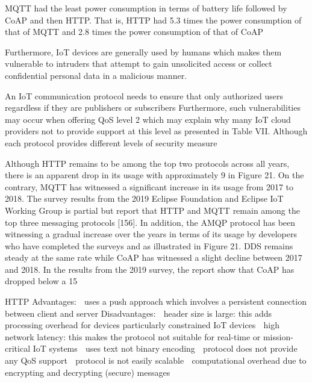  MQTT had the least power consumption in
terms of battery life followed by CoAP and then HTTP. That
is, HTTP had 5.3 times the power consumption of that of MQTT and 2.8 times the power consumption of that of CoAP \cite[23]{protocols}

Furthermore,
IoT devices are generally used by humans which makes them
vulnerable to intruders that attempt to gain unsolicited access
or collect confidential personal data in a malicious manner.
\cite[23]{protocols}

An IoT
communication protocol needs to ensure that only authorized
users regardless if they are publishers or subscribers
Furthermore, such vulnerabilities may occur when
offering QoS level 2 which may explain why many IoT cloud
providers not to provide support at this level as presented in
Table VII. 
Although each protocol provides different levels of
security measure\cite[23]{protocols}

Although HTTP remains to be among the top two
protocols across all years, there is an apparent drop in its
usage with approximately 9%
in Figure 21. On the contrary, MQTT has witnessed a
significant increase in its usage from 2017 to 2018. The
survey results from the 2019 Eclipse Foundation and Eclipse
IoT Working Group is partial but report that HTTP and
MQTT remain among the top three messaging protocols
[156]. In addition, the AMQP protocol has been witnessing
a gradual increase over the years in terms of its usage by
developers who have completed the surveys and as illustrated
in Figure 21. DDS remains steady at the same rate while
CoAP has witnessed a slight decline between 2017 and 2018.
In the results from the 2019 survey, the report show that
CoAP has dropped below a 15%
\cite[26]{protocols}


HTTP
Advantages:
 uses a push approach which involves a persistent
connection between client and server
Disadvantages:
 header size is large: this adds processing overhead for
devices particularly constrained IoT devices
 high network latency: this makes the protocol not
suitable for real-time or mission-critical IoT systems
 uses text not binary encoding
 protocol does not provide any QoS support
 protocol is not easily scalable
 computational overhead due to encrypting and
decrypting (secure) messages
\cite[26]{protocols}

